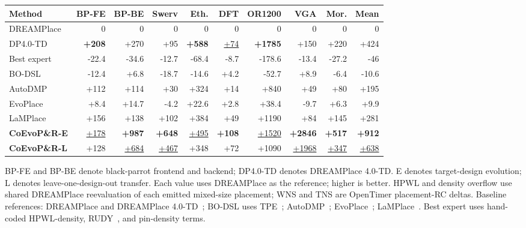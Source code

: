 \begin{table}[t]
\begin{minipage}[t]{0.492\textwidth}
\begin{tabular*}{\linewidth}{
  @{\extracolsep{\fill}} l *{9}{r} @{}
}
\toprule
Method
& BP-FE & BP-BE & Swerv & Eth.
& DFT & OR1200 & VGA & Mor. & Mean \\
\midrule
DREAMPlace       & 0 & 0 & 0 & 0 & 0 & 0 & 0 & 0 & 0 \\
DP4.0-TD         & \cellcolor{rankfirst}\textbf{+208} & +270 & +95 & \cellcolor{rankfirst}\textbf{+588} & \cellcolor{ranksecond}\underline{+74} & \cellcolor{rankfirst}\textbf{+1785} & +150 & +220 & +424 \\
Best expert      & -22.4 & -34.6 & -12.7 & -68.4 & -8.7 & -178.6 & -13.4 & -27.2 & -46 \\
BO-DSL           & -12.4 & +6.8 & -18.7 & -14.6 & +4.2 & -52.7 & +8.9 & -6.4 & -10.6 \\
AutoDMP          & +112 & +114 & +30 & +324 & +14 & +840 & +49 & +80 & +195 \\
EvoPlace         & +8.4 & +14.7 & -4.2 & +22.6 & +2.8 & +38.4 & -9.7 & +6.3 & +9.9 \\
LaMPlace         & +156 & +138 & +102 & +384 & +49 & +1190 & +84 & +145 & +281 \\
\midrule
\textbf{CoEvoP\&R-E}
                 & \cellcolor{ranksecond}\underline{+178} & \cellcolor{rankfirst}\textbf{+987} & \cellcolor{rankfirst}\textbf{+648} & \cellcolor{ranksecond}\underline{+495} & \cellcolor{rankfirst}\textbf{+108} & \cellcolor{ranksecond}\underline{+1520} & \cellcolor{rankfirst}\textbf{+2846} & \cellcolor{rankfirst}\textbf{+517} & \cellcolor{rankfirst}\textbf{+912} \\
\textbf{CoEvoP\&R-L}
                 & +128 & \cellcolor{ranksecond}\underline{+684} & \cellcolor{ranksecond}\underline{+467} & +348 & +72 & +1090 & \cellcolor{ranksecond}\underline{+1968} & \cellcolor{ranksecond}\underline{+347} & \cellcolor{ranksecond}\underline{+638} \\
\bottomrule
\end{tabular*}
\end{minipage}

\vspace{2pt}
\parbox{\textwidth}{\scriptsize
BP-FE and BP-BE denote black-parrot frontend and backend; DP4.0-TD denotes
DREAMPlace 4.0-TD.
E denotes target-design evolution; L denotes leave-one-design-out transfer.
Each value uses DREAMPlace as the reference; higher is better.
HPWL and density overflow use shared DREAMPlace reevaluation of each emitted
mixed-size placement; WNS and TNS are OpenTimer placement-RC deltas.
Baseline references: DREAMPlace and DREAMPlace 4.0-TD~\cite{dreamplace,dreamplace4};
BO-DSL uses TPE~\cite{tpe}; AutoDMP~\cite{autodmp};
EvoPlace~\cite{evoplace}; LaMPlace~\cite{lamplace}. Best expert uses hand-coded HPWL-density,
RUDY~\cite{rudy}, and pin-density terms.}

\end{table}

